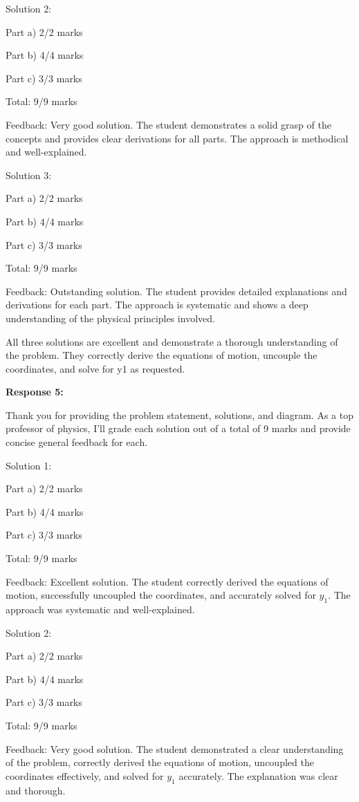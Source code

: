 \documentclass[a4paper,11pt]{article}
\begin{document}
Solution 2:

Part a) 2/2 marks

Part b) 4/4 marks

Part c) 3/3 marks

Total: 9/9 marks

Feedback: Very good solution. The student demonstrates a solid grasp of the concepts and provides clear derivations for all parts. The approach is methodical and well-explained.

Solution 3:

Part a) 2/2 marks

Part b) 4/4 marks

Part c) 3/3 marks

Total: 9/9 marks

Feedback: Outstanding solution. The student provides detailed explanations and derivations for each part. The approach is systematic and shows a deep understanding of the physical principles involved.

All three solutions are excellent and demonstrate a thorough understanding of the problem. They correctly derive the equations of motion, uncouple the coordinates, and solve for y1 as requested.

\bigskip
\textbf{Response 5:}

Thank you for providing the problem statement, solutions, and diagram. As a top professor of physics, I'll grade each solution out of a total of 9 marks and provide concise general feedback for each.

Solution 1:

Part a) 2/2 marks

Part b) 4/4 marks

Part c) 3/3 marks

Total: 9/9 marks

Feedback: Excellent solution. The student correctly derived the equations of motion, successfully uncoupled the coordinates, and accurately solved for \(y_1\). The approach was systematic and well-explained.

Solution 2:

Part a) 2/2 marks

Part b) 4/4 marks

Part c) 3/3 marks

Total: 9/9 marks

Feedback: Very good solution. The student demonstrated a clear understanding of the problem, correctly derived the equations of motion, uncoupled the coordinates effectively, and solved for \(y_1\) accurately. The explanation was clear and thorough.
\end{document}
